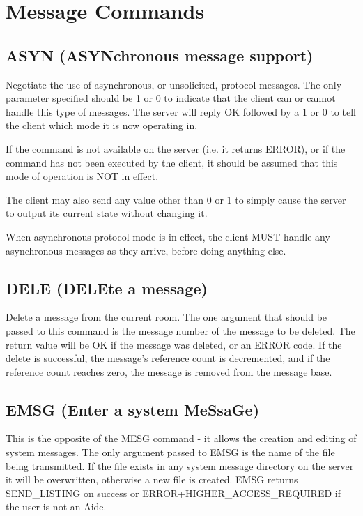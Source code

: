 \section{Message Commands}



\subsection{ASYN (ASYNchronous message support)}

 Negotiate the use of asynchronous, or unsolicited, protocol messages.  The
only parameter specified should be 1 or 0 to indicate that the client can or
cannot handle this type of messages.  The server will reply OK followed by a
1 or 0 to tell the client which mode it is now operating in.

 If the command is not available on the server (i.e. it returns ERROR), or
if the command has not been executed by the client, it should be assumed that
this mode of operation is NOT in effect.

 The client may also send any value other than 0 or 1 to simply cause the
server to output its current state without changing it.

 When asynchronous protocol mode is in effect, the client MUST handle any
asynchronous messages as they arrive, before doing anything else.



\subsection{DELE (DELEte a message)}

 Delete a message from the current room.  The one argument that should be
passed to this command is the message number of the message to be deleted.
The return value will be OK if the message was deleted, or an ERROR code.
If the delete is successful, the message's reference count is decremented, and
if the reference count reaches zero, the message is removed from the message
base.



\subsection{EMSG (Enter a system MeSsaGe)}

 This is the opposite of the MESG command - it allows the creation and editing
of system messages.  The only argument passed to EMSG is the name of the
file being transmitted.  If the file exists in any system message directory
on the server it will be overwritten, otherwise a new file is created.  EMSG
returns SEND_LISTING on success or ERROR+HIGHER_ACCESS_REQUIRED if the user
is not an Aide.

